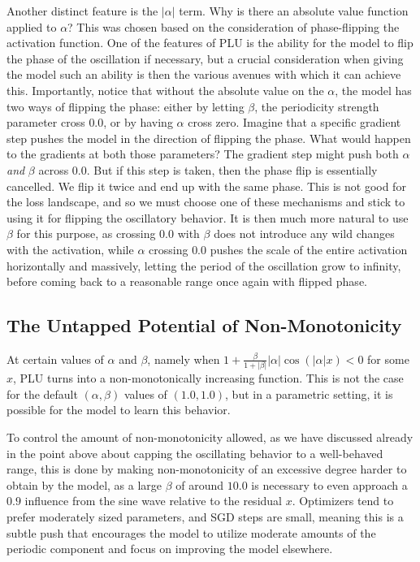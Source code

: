 \documentclass[11pt, letterpaper]{article}
\begin{document}
Another distinct feature is the $\lvert\alpha\rvert$ term. Why is there an absolute value function applied to $\alpha$? This was chosen based on the consideration of phase-flipping the activation function. One of the features of PLU is the ability for the model to flip the phase of the oscillation if necessary, but a crucial consideration when giving the model such an ability is then the various avenues with which it can achieve this. Importantly, notice that without the absolute value on the $\alpha$, the model has two ways of flipping the phase: either by letting $\beta$, the periodicity strength parameter cross $0.0$, or by having $\alpha$ cross zero. Imagine that a specific gradient step pushes the model in the direction of flipping the phase. What would happen to the gradients at both those parameters? The gradient step might push both $\alpha$ \textit{and} $\beta$ across $0.0$. But if this step is taken, then the phase flip is essentially cancelled. We flip it twice and end up with the same phase. This is not good for the loss landscape, and so we must choose one of these mechanisms and stick to using it for flipping the oscillatory behavior. It is then much more natural to use $\beta$ for this purpose, as crossing $0.0$ with $\beta$ does not introduce any wild changes with the activation, while $\alpha$ crossing $0.0$ pushes the scale of the entire activation horizontally and massively, letting the period of the oscillation grow to infinity, before coming back to a reasonable range once again with flipped phase.

\subsection{The Untapped Potential of Non-Monotonicity}

At certain values of $\alpha$ and $\beta$, namely when $1 + \frac{\beta}{1 + \lvert\beta\rvert} \lvert\alpha\rvert \cos(\lvert\alpha\rvert x) < 0$ for some $x$, PLU turns into a non-monotonically increasing function. This is not the case for the default $(\alpha, \beta)$ values of $(1.0, 1.0)$, but in a parametric setting, it is possible for the model to learn this behavior.

To control the amount of non-monotonicity allowed, as we have discussed already in the point above about capping the oscillating behavior to a well-behaved range, this is done by making non-monotonicity of an excessive degree harder to obtain by the model, as a large $\beta$ of around $10.0$ is necessary to even approach a $0.9$ influence from the sine wave relative to the residual $x$. Optimizers tend to prefer moderately sized parameters, and SGD steps are small, meaning this is a subtle push that encourages the model to utilize moderate amounts of the periodic component and focus on improving the model elsewhere.
\end{document}

